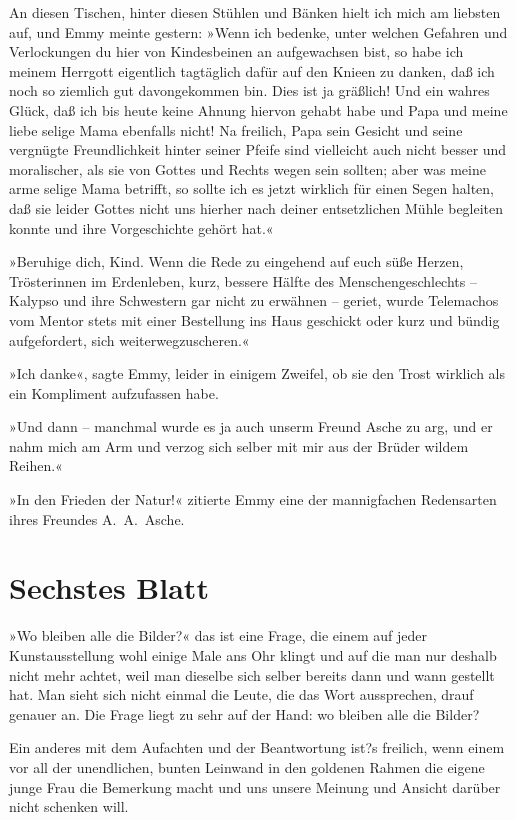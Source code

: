 An diesen Tischen, hinter diesen Stühlen und Bänken hielt ich mich
am liebsten auf, und Emmy meinte gestern: »Wenn ich bedenke, unter
welchen Gefahren und Verlockungen du hier von Kindesbeinen an
aufgewachsen bist, so habe ich meinem Herrgott eigentlich
tagtäglich dafür auf den Knieen zu danken, daß ich noch so ziemlich
gut davongekommen bin. Dies ist ja gräßlich! Und ein wahres Glück,
daß ich bis heute keine Ahnung hiervon gehabt habe und Papa und
meine liebe selige Mama ebenfalls nicht! Na freilich, Papa sein
Gesicht und seine vergnügte Freundlichkeit hinter seiner Pfeife
sind vielleicht auch nicht besser und moralischer, als sie von
Gottes und Rechts wegen sein sollten; aber was meine arme selige
Mama betrifft, so sollte ich es jetzt wirklich für einen Segen
halten, daß sie leider Gottes nicht uns hierher nach deiner
entsetzlichen Mühle begleiten konnte und ihre Vorgeschichte gehört
hat.«

»Beruhige dich, Kind. Wenn die Rede zu eingehend auf euch süße
Herzen, Trösterinnen im Erdenleben, kurz, bessere Hälfte des
Menschengeschlechts – Kalypso und ihre Schwestern gar nicht zu
erwähnen – geriet, wurde Telemachos vom Mentor stets mit einer
Bestellung ins Haus geschickt oder kurz und bündig aufgefordert,
sich weiterwegzuscheren.«

»Ich danke«, sagte Emmy, leider in einigem Zweifel, ob sie den
Trost wirklich als ein Kompliment aufzufassen habe.

»Und dann – manchmal wurde es ja auch unserm Freund Asche zu arg,
und er nahm mich am Arm und verzog sich selber mit mir aus der
Brüder wildem Reihen.«

»In den Frieden der Natur!« zitierte Emmy eine der mannigfachen
Redensarten ihres Freundes A.~A.~Asche.

\section{Sechstes Blatt}

»Wo bleiben alle die Bilder?« das ist eine Frage, die einem auf
jeder Kunstausstellung wohl einige Male ans Ohr klingt und auf die
man nur deshalb nicht mehr achtet, weil man dieselbe sich selber
bereits dann und wann gestellt hat. Man sieht sich nicht einmal die
Leute, die das Wort aussprechen, drauf genauer an. Die Frage liegt
zu sehr auf der Hand: wo bleiben alle die Bilder?

Ein anderes mit dem Aufachten und der Beantwortung ist?s freilich,
wenn einem vor all der unendlichen, bunten Leinwand in den goldenen
Rahmen die eigene junge Frau die Bemerkung macht und uns unsere
Meinung und Ansicht darüber nicht schenken will.

